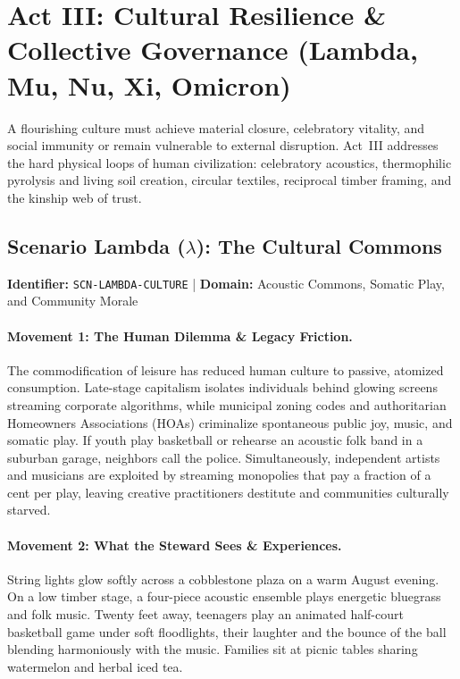 \section{Act III: Cultural Resilience \& Collective Governance (Lambda, Mu, Nu, Xi, Omicron)}
\label{sec:act_3_enterprise}

A flourishing culture must achieve material closure, celebratory vitality, and social immunity or remain vulnerable to external disruption. Act~III addresses the hard physical loops of human civilization: celebratory acoustics, thermophilic pyrolysis and living soil creation, circular textiles, reciprocal timber framing, and the kinship web of trust.

\subsection{Scenario Lambda (\texorpdfstring{$\lambda$}{Lambda}): The Cultural Commons}
\label{subsec:scn_lambda}
\textbf{Identifier:} \texttt{SCN-LAMBDA-CULTURE} \quad | \quad \textbf{Domain:} Acoustic Commons, Somatic Play, and Community Morale

\paragraph{Movement 1: The Human Dilemma \& Legacy Friction.}
The commodification of leisure has reduced human culture to passive, atomized consumption. Late-stage capitalism isolates individuals behind glowing screens streaming corporate algorithms, while municipal zoning codes and authoritarian Homeowners Associations (HOAs) criminalize spontaneous public joy, music, and somatic play. If youth play basketball or rehearse an acoustic folk band in a suburban garage, neighbors call the police. Simultaneously, independent artists and musicians are exploited by streaming monopolies that pay a fraction of a cent per play, leaving creative practitioners destitute and communities culturally starved.

\paragraph{Movement 2: What the Steward Sees \& Experiences.}
String lights glow softly across a cobblestone plaza on a warm August evening. On a low timber stage, a four-piece acoustic ensemble plays energetic bluegrass and folk music. Twenty feet away, teenagers play an animated half-court basketball game under soft floodlights, their laughter and the bounce of the ball blending harmoniously with the music. Families sit at picnic tables sharing watermelon and herbal iced tea. 

